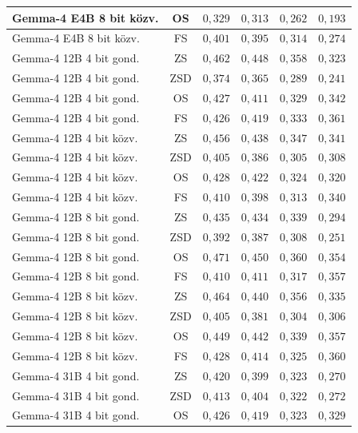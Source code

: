 \documentclass[
]{elteikthesis}[2024/04/26]
\begin{document}
\begin{longtable}{ | l | c | r | r | r | r | }
	\hline
	Gemma-4 E4B 8 bit közv. & OS & $0{,}329$ & $0{,}313$ & $0{,}262$ & $0{,}193$ \\
	\hline
	Gemma-4 E4B 8 bit közv. & FS & $0{,}401$ & $0{,}395$ & $0{,}314$ & $0{,}274$ \\
	\hline
	Gemma-4 12B 4 bit gond. & ZS & $0{,}462$ & $0{,}448$ & $0{,}358$ & $0{,}323$ \\
	\hline
	Gemma-4 12B 4 bit gond. & ZSD & $0{,}374$ & $0{,}365$ & $0{,}289$ & $0{,}241$ \\
	\hline
	Gemma-4 12B 4 bit gond. & OS & $0{,}427$ & $0{,}411$ & $0{,}329$ & $0{,}342$ \\
	\hline
	Gemma-4 12B 4 bit gond. & FS & $0{,}426$ & $0{,}419$ & $0{,}333$ & $0{,}361$ \\
	\hline
	Gemma-4 12B 4 bit közv. & ZS & $0{,}456$ & $0{,}438$ & $0{,}347$ & $0{,}341$ \\
	\hline
	Gemma-4 12B 4 bit közv. & ZSD & $0{,}405$ & $0{,}386$ & $0{,}305$ & $0{,}308$ \\
	\hline
	Gemma-4 12B 4 bit közv. & OS & $0{,}428$ & $0{,}422$ & $0{,}324$ & $0{,}320$ \\
	\hline
	Gemma-4 12B 4 bit közv. & FS & $0{,}410$ & $0{,}398$ & $0{,}313$ & $0{,}340$ \\
	\hline
	Gemma-4 12B 8 bit gond. & ZS & $0{,}435$ & $0{,}434$ & $0{,}339$ & $0{,}294$ \\
	\hline
	Gemma-4 12B 8 bit gond. & ZSD & $0{,}392$ & $0{,}387$ & $0{,}308$ & $0{,}251$ \\
	\hline
	Gemma-4 12B 8 bit gond. & OS & $0{,}471$ & $0{,}450$ & $0{,}360$ & $0{,}354$ \\
	\hline
	Gemma-4 12B 8 bit gond. & FS & $0{,}410$ & $0{,}411$ & $0{,}317$ & $0{,}357$ \\
	\hline
	Gemma-4 12B 8 bit közv. & ZS & $0{,}464$ & $0{,}440$ & $0{,}356$ & $0{,}335$ \\
	\hline
	Gemma-4 12B 8 bit közv. & ZSD & $0{,}405$ & $0{,}381$ & $0{,}304$ & $0{,}306$ \\
	\hline
	Gemma-4 12B 8 bit közv. & OS & $0{,}449$ & $0{,}442$ & $0{,}339$ & $0{,}357$ \\
	\hline
	Gemma-4 12B 8 bit közv. & FS & $0{,}428$ & $0{,}414$ & $0{,}325$ & $0{,}360$ \\
	\hline
	Gemma-4 31B 4 bit gond. & ZS & $0{,}420$ & $0{,}399$ & $0{,}323$ & $0{,}270$ \\
	\hline
	Gemma-4 31B 4 bit gond. & ZSD & $0{,}413$ & $0{,}404$ & $0{,}322$ & $0{,}272$ \\
	\hline
	Gemma-4 31B 4 bit gond. & OS & $0{,}426$ & $0{,}419$ & $0{,}323$ & $0{,}329$ \\

\end{longtable}
\end{document}
